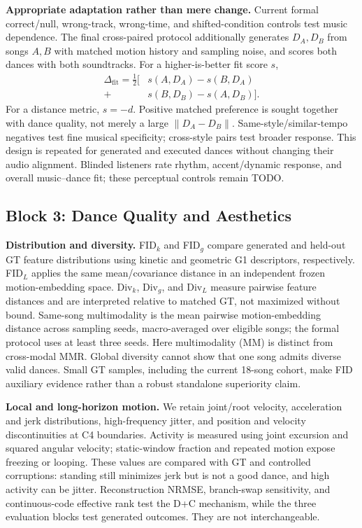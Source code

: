 \textbf{Appropriate adaptation rather than mere change.} Current formal
correct/null, wrong-track, wrong-time, and shifted-condition controls test
music dependence. The final cross-paired protocol additionally generates
$D_A,D_B$ from songs $A,B$ with matched motion history and sampling noise, and
scores both dances with both soundtracks. For a higher-is-better fit score $s$,
\begin{align}
 \Delta_{\mathrm{fit}}=\tfrac12\big[&s(A,D_A)-s(B,D_A)\nonumber\\
                              +&s(B,D_B)-s(A,D_B)\big].
 \label{eq:cross_music_fit}
\end{align}
For a distance metric, $s=-d$. Positive matched preference is sought together
with dance quality, not merely a large $\|D_A-D_B\|$. Same-style/similar-tempo
negatives test fine musical specificity; cross-style pairs test broader
response. This design is repeated for generated and executed dances without
changing their audio alignment. Blinded listeners rate rhythm, accent/dynamic
response, and overall music--dance fit; these perceptual controls remain TODO.

\subsection{Block 3: Dance Quality and Aesthetics}
\textbf{Distribution and diversity.} FID$_k$ and FID$_g$ compare generated and
held-out GT feature distributions using kinetic and geometric G1 descriptors,
respectively. FID$_L$ applies the same mean/covariance distance in an independent
frozen motion-embedding space. Div$_k$, Div$_g$, and Div$_L$ measure pairwise
feature distances and are interpreted relative to matched GT, not maximized
without bound. Same-song multimodality is the mean pairwise motion-embedding
distance across sampling seeds, macro-averaged over eligible songs; the formal
protocol uses at least three seeds. Here multimodality (MM) is distinct from
cross-modal MMR. Global diversity cannot show that one song admits diverse
valid dances. Small GT samples, including the current 18-song cohort, make FID
auxiliary evidence rather than a robust standalone superiority claim.

\textbf{Local and long-horizon motion.} We retain joint/root velocity,
acceleration and jerk distributions, high-frequency jitter, and position and
velocity discontinuities at C4 boundaries. Activity is measured using joint
excursion and squared angular velocity; static-window fraction and repeated
motion expose freezing or looping. These values are compared with GT and
controlled corruptions: standing still minimizes jerk but is not a good dance,
and high activity can be jitter. Reconstruction NRMSE, branch-swap sensitivity,
and continuous-code effective rank test the D+C mechanism, while the three
evaluation blocks test generated outcomes. They are not interchangeable.

